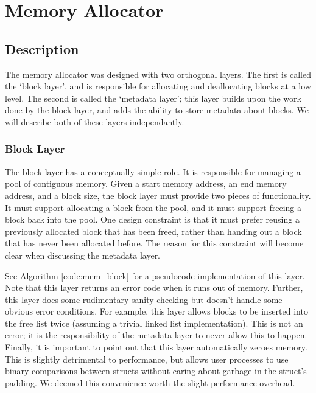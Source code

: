 \documentclass[12pt]{report}
\begin{document}
\chapter{Memory Allocator}

\section{Description}
    The memory allocator was designed with two orthogonal layers. The first is
    called the `block layer', and is responsible for allocating and deallocating
    blocks at a low level. The second is called the `metadata layer'; this layer
    builds upon the work done by the block layer, and adds the ability to store
    metadata about blocks. We will describe both of these layers independantly.

\subsection{Block Layer}
    The block layer has a conceptually simple role. It is responsible for
    managing a pool of contiguous memory. Given a start memory address, an
    end memory address, and a block size, the block
    layer must provide two pieces of functionality. It must support allocating
    a block from the pool, and it must support freeing a block back into the
    pool. One design constraint is that it must prefer reusing a previously
    allocated block that has been freed, rather than handing out a block that
    has never been allocated before. The reason for this constraint will
    become clear when discussing the metadata layer.

    See Algorithm \ref{code:mem_block} for a pseudocode implementation of this
    layer. Note that this layer returns an error code when it runs out of
    memory. Further, this layer does some rudimentary sanity checking but
    doesn't handle some obvious error conditions. For example, this layer allows
    blocks to be inserted into the free list twice (assuming a trivial linked
    list implementation). This is not an error; it is the responsibility of
    the metadata layer to never allow this to happen. Finally, it is important
    to point out that this layer automatically zeroes memory. This is slightly
    detrimental to performance, but allows user processes to use binary
    comparisons between structs without caring about garbage in the struct's
    padding. We deemed this convenience worth the slight performance overhead.
\end{document}
